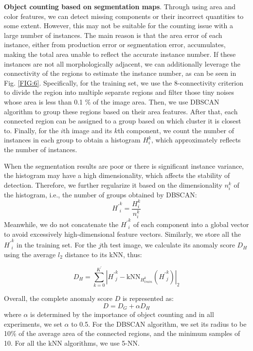 \documentclass[final,5p,times,twocolumn]{elsarticle}
\begin{document}
\textbf{Object counting based on segmentation maps}. Through using area and color features, we can detect missing components or their incorrect quantities to some extent. However, this may not be suitable for the counting issue with a large number of instances. The main reason is that the area error of each instance, either from production error or segmentation error, accumulates, making the total area unable to reflect the accurate instance number. If these instances are not all morphologically adjacent, we can additionally leverage the connectivity of the regions to estimate the instance number, as can be seen in Fig. \ref{FIG:6}. Specifically, for the training set, we use the 8-connectivity criterion to divide the region into multiple separate regions and filter those tiny noises whose area is less than 0.1 \% of the image area. Then, we use DBSCAN \cite{ester1996density} algorithm to group these regions based on their area features. After that, each connected region can be assigned to a group based on which cluster it is closest to. Finally, for the $i$th image and its $k$th component, we count the number of instances in each group to obtain a histogram $H_i^k$, which approximately reflects the number of instances.

When the segmentation results are poor or there is significant instance variance, the histogram may have a high dimensionality, which affects the stability of detection. Therefore, we further regularize it based on the dimensionality $n_i^k$ of the histogram, i.e., the number of groups obtained by DBSCAN:
\begin{equation}
{H^{'}}_i^k = \frac{H_i^k}{n_i^k}
\end{equation}
Meanwhile, we do not concatenate the ${H^{'}}_i^k$ of each component into a global vector to avoid excessively high-dimensional feature vectors. Similarly, we store all the ${H^{'}}_i^k$ in the training set. For the $j$th test image, we calculate its anomaly score $D_H$ using the average $l_2$ distance to its kNN, thus:

\begin{equation}
D_H= \sum_{k=0}^{K^{'}}|{H^{'}}_j^k-\mathrm{kNN}_{H^k_{train}}({H^{'}}_j^k)|_2
\end{equation}

Overall, the complete anomaly score $D$ is represented as:
\begin{equation}
D= D_G + \alpha D_H
\end{equation}
where $\alpha$ is determined by the importance of object counting and in all experiments, we set $\alpha$ to 0.5. For the DBSCAN algorithm, we set its radius to be 10\% of the average area of the connected regions, and the minimum samples of 10. For all the kNN algorithms, we use 5-NN.
\end{document}
